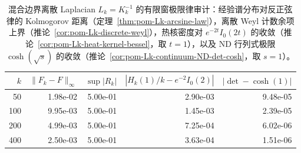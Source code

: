 \begin{table}[H]
\centering
\scriptsize
\setlength{\tabcolsep}{6pt}
\caption{混合边界离散 Laplacian $L_k=K_k^{-1}$ 的有限窗极限律审计：经验谱分布对反正弦律的 Kolmogorov 距离（定理~\ref{thm:pom-Lk-arcsine-law}），离散 Weyl 计数余项上界（推论~\ref{cor:pom-Lk-discrete-weyl}），热核密度对 $e^{-2t}I_0(2t)$ 的收敛（推论~\ref{cor:pom-Lk-heat-kernel-bessel}，取 $t=1$），以及 ND 行列式极限 $\cosh(\sqrt{s})$ 的收敛（推论~\ref{cor:pom-Lk-continuum-ND-det-cosh}，取 $s=1$）。}
\label{tab:fence_green_kernel_spectral_limit_laws_audit}
\begin{tabular}{r r r r r}
\toprule
$k$ & $\|F_k-F\|_{\infty}$ & $\sup|R_k|$ & $|H_k(1)/k- e^{-2}I_0(2)|$ & $|\det-\cosh(1)|$\\
\midrule
50 & 1.98e-02 & 5.00e-01 & 2.90e-03 & 9.48e-05\\
100 & 9.95e-03 & 5.00e-01 & 1.45e-03 & 2.39e-05\\
200 & 4.99e-03 & 5.00e-01 & 7.25e-04 & 6.02e-06\\
400 & 2.50e-03 & 5.00e-01 & 3.63e-04 & 1.51e-06\\
\bottomrule
\end{tabular}
\end{table}
